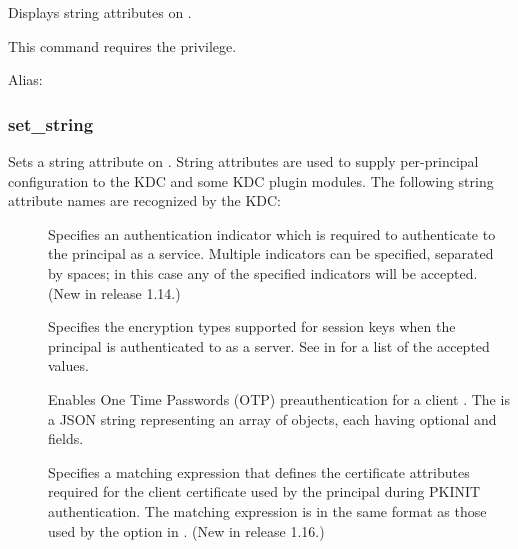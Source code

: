 \documentclass[letterpaper,10pt,english]{sphinxmanual}
\begin{document}
Displays string attributes on .

This command requires the  privilege.

Alias: 

\label{\detokenize{admin/admin_commands/kadmin_local:get-strings-end}}

\subsubsection{set\_string}
\label{\detokenize{admin/admin_commands/kadmin_local:id10}}\label{\detokenize{admin/admin_commands/kadmin_local:set-string}}\label{\detokenize{admin/admin_commands/kadmin_local:get-strings-end}}\begin{quote}

   
\end{quote}

Sets a string attribute on .  String attributes are used to
supply per-principal configuration to the KDC and some KDC plugin
modules.  The following string attribute names are recognized by the
KDC:
\begin{description}
\item[{}] \leavevmode
Specifies an authentication indicator which is required to
authenticate to the principal as a service.  Multiple indicators
can be specified, separated by spaces; in this case any of the
specified indicators will be accepted.  (New in release 1.14.)

\item[{}] \leavevmode
Specifies the encryption types supported for session keys when the
principal is authenticated to as a server.  See
{\hyperref[\detokenize{admin/conf_files/kdc_conf:encryption-types}]{}} in {\hyperref[\detokenize{admin/conf_files/kdc_conf:kdc-conf-5}]{}} for a list of the
accepted values.

\item[{}] \leavevmode
Enables One Time Passwords (OTP) preauthentication for a client
.  The  is a JSON string representing an array
of objects, each having optional  and  fields.

\item[{}] \leavevmode
Specifies a matching expression that defines the certificate
attributes required for the client certificate used by the
principal during PKINIT authentication.  The matching expression
is in the same format as those used by the 
option in {\hyperref[\detokenize{admin/conf_files/krb5_conf:krb5-conf-5}]{}}.  (New in release 1.16.)

\end{description}
\end{document}
